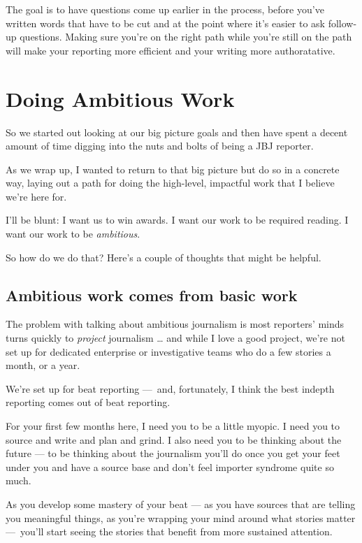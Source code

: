 \documentclass[
  12pt,
  american,
  letterpaperpaper,
  extrafontsizes,onecolumn,openright
  ]{memoir}
\begin{document}
The goal is to have questions come up earlier in the process, before you've written words that have to be cut and at the point where it's easier to ask follow-up questions. Making sure you're on the right path while you're still on the path will make your reporting more efficient and your writing more authoratative.

\hypertarget{doing-ambitious-work}{%
\chapter{Doing Ambitious Work}\label{doing-ambitious-work}}

So we started out looking at our big picture goals and then have spent a decent amount of time digging into the nuts and bolts of being a JBJ reporter.

As we wrap up, I wanted to return to that big picture but do so in a concrete way, laying out a path for doing the high-level, impactful work that I believe we're here for.

I'll be blunt: I want us to win awards. I want our work to be required reading. I want our work to be \emph{ambitious}.

So how do we do that? Here's a couple of thoughts that might be helpful.

\hypertarget{ambitious-work-comes-from-basic-work}{%
\section*{Ambitious work comes from basic work}\label{ambitious-work-comes-from-basic-work}}

The problem with talking about ambitious journalism is most reporters' minds turns quickly to \emph{project} journalism \ldots{} and while I love a good project, we're not set up for dedicated enterprise or investigative teams who do a few stories a month, or a year.

We're set up for beat reporting ---~and, fortunately, I think the best indepth reporting comes out of beat reporting.

For your first few months here, I need you to be a little myopic. I need you to source and write and plan and grind. I also need you to be thinking about the future --- to be thinking about the journalism you'll do once you get your feet under you and have a source base and don't feel importer syndrome quite so much.

As you develop some mastery of your beat --- as you have sources that are telling you meaningful things, as you're wrapping your mind around what stories matter ---~you'll start seeing the stories that benefit from more sustained attention.
\end{document}
